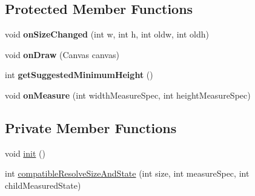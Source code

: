 \subsection*{Protected Member Functions}
\begin{DoxyCompactItemize}
\item 
\hypertarget{classcom_1_1qualoutdoor_1_1recorder_1_1map_1_1ColoredScale_a80ca17312e54ae5d8e74c4bdf6d5253a}{void {\bfseries on\-Size\-Changed} (int w, int h, int oldw, int oldh)}\label{classcom_1_1qualoutdoor_1_1recorder_1_1map_1_1ColoredScale_a80ca17312e54ae5d8e74c4bdf6d5253a}

\item 
\hypertarget{classcom_1_1qualoutdoor_1_1recorder_1_1map_1_1ColoredScale_a0b8692a3eed077a960f18ad4a9b04798}{void {\bfseries on\-Draw} (Canvas canvas)}\label{classcom_1_1qualoutdoor_1_1recorder_1_1map_1_1ColoredScale_a0b8692a3eed077a960f18ad4a9b04798}

\item 
\hypertarget{classcom_1_1qualoutdoor_1_1recorder_1_1map_1_1ColoredScale_a79be240a4bfba2b93b88df71ef1035b9}{int {\bfseries get\-Suggested\-Minimum\-Height} ()}\label{classcom_1_1qualoutdoor_1_1recorder_1_1map_1_1ColoredScale_a79be240a4bfba2b93b88df71ef1035b9}

\item 
\hypertarget{classcom_1_1qualoutdoor_1_1recorder_1_1map_1_1ColoredScale_a05edef11c21f7dc8aab2c98944c52372}{void {\bfseries on\-Measure} (int width\-Measure\-Spec, int height\-Measure\-Spec)}\label{classcom_1_1qualoutdoor_1_1recorder_1_1map_1_1ColoredScale_a05edef11c21f7dc8aab2c98944c52372}

\end{DoxyCompactItemize}
\subsection*{Private Member Functions}
\begin{DoxyCompactItemize}
\item 
void \hyperlink{classcom_1_1qualoutdoor_1_1recorder_1_1map_1_1ColoredScale_a2e15ef8de5c135bc1967e33d7a0095a5}{init} ()
\item 
int \hyperlink{classcom_1_1qualoutdoor_1_1recorder_1_1map_1_1ColoredScale_a497e3a7f1dd45ff848916b04d31c4e7d}{compatible\-Resolve\-Size\-And\-State} (int size, int measure\-Spec, int child\-Measured\-State)
\end{DoxyCompactItemize}
